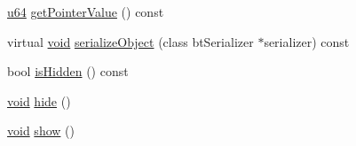 \begin{DoxyCompactItemize}
\mbox{\hyperlink{_util_8h_ad758b7a5c3f18ed79d2fcd23d9f16357}{u64}} \mbox{\hyperlink{classnjli_1_1_dropdown_h_u_d_a4ffddf141a426a5a07d0ac19f1913811}{get\+Pointer\+Value}} () const
\item 
virtual \mbox{\hyperlink{_thread_8h_af1e856da2e658414cb2456cb6f7ebc66}{void}} \mbox{\hyperlink{classnjli_1_1_dropdown_h_u_d_a4fc4bcd9d1930911474210c047372fc0}{serialize\+Object}} (class bt\+Serializer $\ast$serializer) const
\item 
bool \mbox{\hyperlink{classnjli_1_1_dropdown_h_u_d_a3009efb11b4bcd56bd933c21b230a125}{is\+Hidden}} () const
\item 
\mbox{\hyperlink{_thread_8h_af1e856da2e658414cb2456cb6f7ebc66}{void}} \mbox{\hyperlink{classnjli_1_1_dropdown_h_u_d_a5d7b8b3bc421084f282343e506a6d289}{hide}} ()
\item 
\mbox{\hyperlink{_thread_8h_af1e856da2e658414cb2456cb6f7ebc66}{void}} \mbox{\hyperlink{classnjli_1_1_dropdown_h_u_d_a73ffd499fceaacd59b518a541ed2133e}{show}} ()
\end{DoxyCompactItemize}
